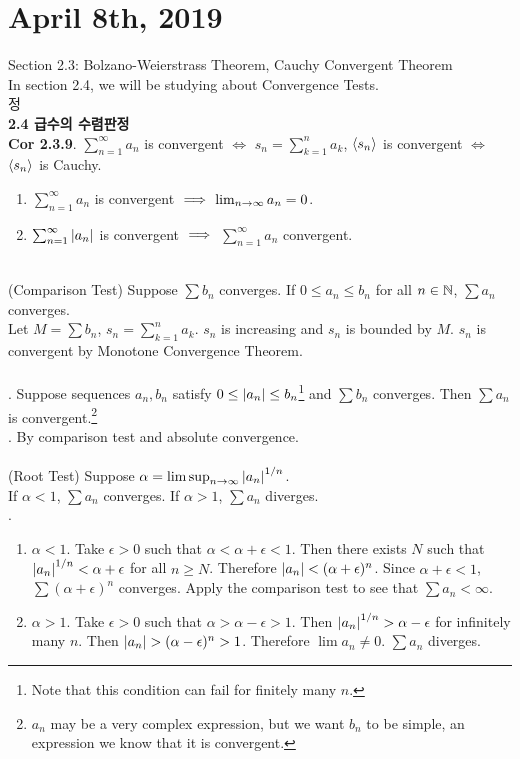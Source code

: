 \section*{April 8th, 2019}
Section 2.3: Bolzano-Weierstrass Theorem, Cauchy Convergent Theorem\\
In section 2.4, we will be studying about Convergence Tests.\\정
\\
\textbf{2.4 급수의 수렴판정}\\
\textbf{Cor 2.3.9}. $ \sum_{n=1}^{\infty} a_n $ is convergent $\iff$ $s_n = \sum_{k=1}^n a_k$, $\left\langle s_n \right\rangle$ is convergent $\iff$ $\left\langle s_n \right\rangle$ is Cauchy.
\begin{enumerate}
	\item $\sum_{n=1}^\infty a_n$ is convergent $\implies$ $\lim_{n\rightarrow \infty} a_n = 0$.
	\item $\sum_{n=1}^\infty \left|a_n\right|$ is convergent $\implies$ $\sum_{n=1}^\infty a_n$ convergent.
\end{enumerate}~\\
 (Comparison Test) Suppose $\sum b_n$ converges. If $0\leq a_n\leq b_n$ for all $n\in \mathbb{N}$, $\sum a_n$ converges.\\
\pf Let $M = \sum b_n$, $s_n = \sum_{k=1}^n a_k$. $s_n$ is increasing and $s_n$ is bounded by $M$. $s_n$ is convergent by Monotone Convergence Theorem.\\
\\
\thm{}. Suppose sequences $a_n, b_n$ satisfy $0\leq \left|a_n\right|\leq b_n$\footnote{Note that this condition can fail for finitely many $n$.} and $\sum b_n$ converges. Then $\sum a_n$ is convergent.\footnote{$a_n$ may be a very complex expression, but we want $b_n$ to be simple, an expression we know that it is convergent.}\\
\pf. By comparison test and absolute convergence.\\
\\
 (Root Test) Suppose $\alpha = \limsup_{n\rightarrow\infty} \left|a_n\right|^{1/n}$.\\
If $\alpha < 1$, $\sum a_n$ converges. If $\alpha>1$, $\sum a_n$ diverges.\\
\pf.
\begin{enumerate}
	\item $\alpha < 1$. Take $\epsilon > 0$ such that $\alpha < \alpha+\epsilon<1$. Then there exists $N$ such that $\left|a_n\right|^{1/n} < \alpha+\epsilon$ for all $n\geq N$. Therefore
	$\left|a_n\right| < (\alpha+\epsilon)^n$. Since $\alpha+\epsilon < 1$, $\sum (\alpha + \epsilon)^n$ converges. Apply the comparison test to see that $\sum a_n <\infty$.
	\item $\alpha > 1$. Take $\epsilon >0$ such that $\alpha > \alpha - \epsilon > 1$. Then $\left|a_n\right|^{1/n} > \alpha-\epsilon$ for infinitely many $n$. Then $\left|a_n\right| > (\alpha -\epsilon)^n > 1$. Therefore $\lim a_n \neq 0$. $\sum a_n$ diverges.
\end{enumerate}
